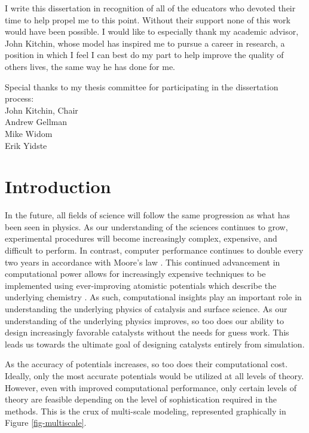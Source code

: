 \documentclass[12pt,oneside]{cmuthesis}
\begin{document}
\begin{acknowledgments}
I write this dissertation in recognition of all of the educators who devoted their time to help propel me to this point. Without their support none of this work would have been possible. I would like to especially thank my academic advisor, John Kitchin, whose model has inspired me to pursue a career in research, a position in which I feel I can best do my part to help improve the quality of others lives, the same way he has done for me.

Special thanks to my thesis committee for participating in the dissertation process: \\
John Kitchin, Chair \\
Andrew Gellman \\
Mike Widom \\
Erik Yidste
\end{acknowledgments}

\tableofcontents
\listoftables
\listoffigures

\mainmatter
\renewcommand{\baselinestretch}{1.66}\normalsize

\chapter{Introduction}
\label{sec:ch0}
In the future, all fields of science will follow the same progression as what has been seen in physics. As our understanding of the sciences continues to grow, experimental procedures will become increasingly complex, expensive, and difficult to perform. In contrast, computer performance continues to double every two years in accordance with Moore's law \cite{schaller-1997-moores-law}. This continued advancement in computational power allows for increasingly expensive techniques to be implemented using ever-improving atomistic potentials which describe the underlying chemistry \cite{boes-2016-neural-networ,perdew-2005-presc-desig}. As such, computational insights play an important role in understanding the underlying physics of catalysis and surface science. As our understanding of the underlying physics improves, so too does our ability to design increasingly favorable catalysts without the needs for guess work. This leads us towards the ultimate goal of designing catalysts entirely from simulation.

As the accuracy of potentials increases, so too does their computational cost. Ideally, only the most accurate potentials would be utilized at all levels of theory. However, even with improved computational performance, only certain levels of theory are feasible depending on the level of sophistication required in the methods. This is the crux of multi-scale modeling, represented graphically in Figure \ref{fig-multiscale}.
\end{document}
